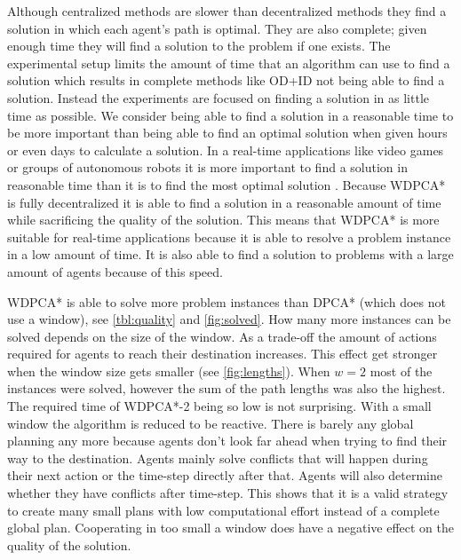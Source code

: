 Although centralized methods are slower than decentralized methods they find a 
solution in which each agent's path is optimal. They are
also complete; given enough time they will find a solution to the problem if 
one exists. The experimental setup limits the amount of time that an algorithm 
can use to find a solution which results in complete methods like OD+ID not 
being able to find a solution.
Instead the experiments are focused on finding a solution in as
little time as possible. We consider being able to find a solution in
a reasonable time to be more important than being able to find an optimal 
solution when
given hours or even days to calculate a solution. In a real-time applications
like video games or groups of autonomous robots it is more important to find a
solution in reasonable time than it is to find the most optimal solution
\cite{botea2013}.
Because WDPCA* is fully decentralized it is able to find a solution in a
reasonable amount of time while sacrificing the quality of the solution. This
means that WDPCA* is more suitable for real-time applications because it is
able to resolve a problem instance in a low amount of time. It is also able to
find a solution to problems with a large amount of agents because of this speed.

WDPCA* is able to solve more problem instances than DPCA* (which does not use a 
window), see \autoref{tbl:quality} and \autoref{fig:solved}. How many more 
instances can be solved depends on the
size of the window. As a trade-off the amount of actions required for agents to
reach their destination increases. This effect get stronger when the window
size gets smaller (see \autoref{fig:lengths}). When $w=2$ most of the instances 
were solved, however the
sum of the path lengths was also the highest. The required time of WDPCA*-2 
being so low is not surprising. With a small window the algorithm is reduced to 
be
reactive. There is barely any global planning any more because agents don't
look far ahead when trying to find their way to the destination. Agents mainly
solve conflicts that will happen during their next action or the time-step 
directly after that. Agents will also determine whether they have
conflicts after time-step. This shows that it is a valid strategy to create
many small plans with low computational effort instead of a complete global
plan. Cooperating in too small a window does have a negative effect on the
quality of the solution.

